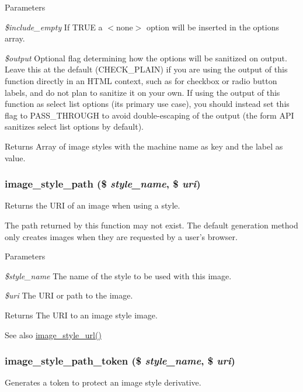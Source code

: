 \begin{DoxyParams}{Parameters}
\item[{\em \$include\_\-empty}]If TRUE a $<$none$>$ option will be inserted in the options array. \item[{\em \$output}]Optional flag determining how the options will be sanitized on output. Leave this at the default (CHECK\_\-PLAIN) if you are using the output of this function directly in an HTML context, such as for checkbox or radio button labels, and do not plan to sanitize it on your own. If using the output of this function as select list options (its primary use case), you should instead set this flag to PASS\_\-THROUGH to avoid double-\/escaping of the output (the form API sanitizes select list options by default).\end{DoxyParams}
\begin{DoxyReturn}{Returns}
Array of image styles with the machine name as key and the label as value. 
\end{DoxyReturn}
\hypertarget{image_8module_a993e0bcd2c632aa81deb0da7e3baa84c}{
\subsubsection[{image\_\-style\_\-path}]{\setlength{\rightskip}{0pt plus 5cm}image\_\-style\_\-path (\$ {\em style\_\-name}, \/  \$ {\em uri})}}
\label{image_8module_a993e0bcd2c632aa81deb0da7e3baa84c}
Returns the URI of an image when using a style.

The path returned by this function may not exist. The default generation method only creates images when they are requested by a user's browser.


\begin{DoxyParams}{Parameters}
\item[{\em \$style\_\-name}]The name of the style to be used with this image. \item[{\em \$uri}]The URI or path to the image.\end{DoxyParams}
\begin{DoxyReturn}{Returns}
The URI to an image style image. 
\end{DoxyReturn}
\begin{DoxySeeAlso}{See also}
\hyperlink{image_8module_a306cf59855e3462ac9539850d4c763eb}{image\_\-style\_\-url()} 
\end{DoxySeeAlso}
\hypertarget{image_8module_a97eaa4de01dc69378e7fc314438abe5a}{
\subsubsection[{image\_\-style\_\-path\_\-token}]{\setlength{\rightskip}{0pt plus 5cm}image\_\-style\_\-path\_\-token (\$ {\em style\_\-name}, \/  \$ {\em uri})}}
\label{image_8module_a97eaa4de01dc69378e7fc314438abe5a}
Generates a token to protect an image style derivative.

